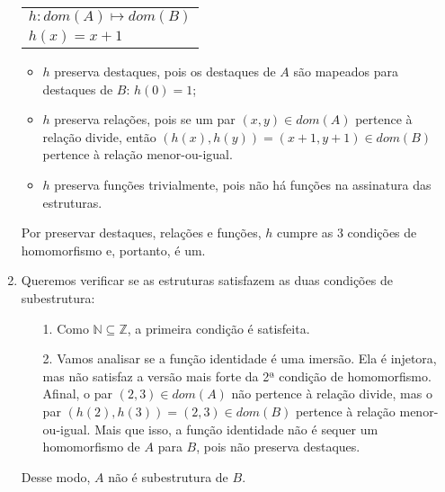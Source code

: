 \begin{rexercises}
\begin{question}
\begin{resolution}
\begin{enumerate}[leftmargin=*]
                \begin{center}
                    \begin{tabular}{l}
                        $h$$: dom(A) \mapsto dom(B)$ \\
                        $h(x) = x + 1$
                    \end{tabular}
                \end{center}
                \begin{itemize}
                    \item $h$ preserva destaques, pois os destaques de $A$ são mapeados para destaques de $B$: $h(0) = 1$;
                    \item $h$ preserva relações, pois se um par $(x, y) \in dom(A)$ pertence à relação divide, então $(h(x), h(y)) = (x + 1, y + 1) \in dom(B)$ pertence à relação menor-ou-igual.
                    \item $h$ preserva funções trivialmente, pois não há funções na assinatura das estruturas.
                \end{itemize}
                Por preservar destaques, relações e funções, $h$ cumpre as 3 condições de homomorfismo e, portanto, é um.

                \item Queremos verificar se as estruturas satisfazem as duas condições de subestrutura:
                \begin{enumerate}
                    \item[1.] Como $\mathbb{N} \subseteq \mathbb{Z}$, a primeira condição é satisfeita.
                    \item[2.] Vamos analisar se a função identidade é uma imersão. Ela é injetora, mas não satisfaz a versão mais forte da 2ª condição de homomorfismo. Afinal, o par $(2, 3) \in dom(A)$ não pertence à relação divide, mas o par $(h(2), h(3)) = (2, 3) \in dom(B)$ pertence à relação menor-ou-igual. Mais que isso, a função identidade não é sequer um homomorfismo de $A$ para $B$, pois não preserva destaques.
                \end{enumerate}
                Desse modo, $A$ não é subestrutura de $B$.
            \end{enumerate}
        \end{resolution}
    \end{question}
\end{rexercises}

